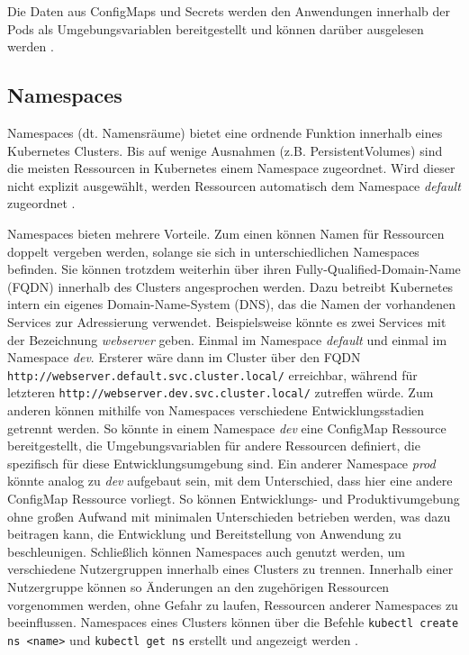 \documentclass[11pt,a4paper]{article}
\begin{document}
Die Daten aus ConfigMaps und Secrets werden den Anwendungen innerhalb der Pods als Umgebungsvariablen
bereitgestellt und können darüber ausgelesen werden \cite{Schmeling_Dargatz_2022}.

\subsection{Namespaces}
Namespaces (dt. Namensräume) bietet eine ordnende Funktion innerhalb eines Kubernetes Clusters.
Bis auf wenige Ausnahmen (z.B. PersistentVolumes) sind die meisten Ressourcen in Kubernetes einem
Namespace zugeordnet. Wird dieser nicht explizit ausgewählt, werden Ressourcen automatisch dem
Namespace \emph{default} zugeordnet \cite{Schmeling_Dargatz_2022}.

Namespaces bieten mehrere Vorteile. Zum einen können Namen für Ressourcen doppelt vergeben werden,
solange sie sich in unterschiedlichen Namespaces befinden. Sie können trotzdem weiterhin
über ihren Fully-Qualified-Domain-Name (FQDN) innerhalb des Clusters angesprochen werden.
Dazu betreibt Kubernetes intern ein eigenes Domain-Name-System (DNS), das die Namen
der vorhandenen Services zur Adressierung verwendet.
Beispielsweise könnte es zwei Services mit der Bezeichnung \emph{webserver} geben.
Einmal im Namespace \emph{default} und einmal im Namespace \emph{dev}.
Ersterer wäre dann im Cluster über den FQDN \lstinline|http://webserver.default.svc.cluster.local/|
erreichbar, während für letzteren \lstinline|http://webserver.dev.svc.cluster.local/| zutreffen würde.
Zum anderen können mithilfe von Namespaces verschiedene Entwicklungsstadien getrennt werden.
So könnte in einem Namespace \emph{dev} eine ConfigMap Ressource bereitgestellt,
die Umgebungsvariablen für andere Ressourcen definiert, die spezifisch für diese
Entwicklungsumgebung sind. Ein anderer Namespace \emph{prod} könnte analog zu \emph{dev}
aufgebaut sein, mit dem Unterschied, dass hier eine andere ConfigMap Ressource vorliegt.
So können Entwicklungs- und Produktivumgebung ohne großen Aufwand mit minimalen Unterschieden betrieben
werden, was dazu beitragen kann, die Entwicklung und Bereitstellung von Anwendung zu beschleunigen.
Schließlich können Namespaces auch genutzt werden, um verschiedene Nutzergruppen innerhalb eines Clusters
zu trennen. Innerhalb einer Nutzergruppe können so Änderungen an den zugehörigen Ressourcen vorgenommen werden,
ohne Gefahr zu laufen, Ressourcen anderer Namespaces zu beeinflussen.
Namespaces eines Clusters können über die Befehle \lstinline|kubectl create ns <name>| und
\lstinline|kubectl get ns| erstellt und angezeigt werden \cite{Schmeling_Dargatz_2022}.
\end{document}
